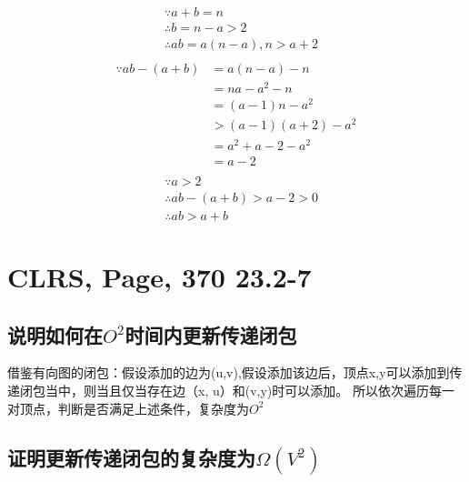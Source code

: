 \documentclass[UTF8]{ctexart}
\begin{document}
\begin{displaymath}
    \begin{aligned}
    &\because a+b=n\\
    &\therefore b=n-a>2\\
    &\therefore ab=a(n-a), n>a+2 \\
\end{aligned}
\end{displaymath}
\begin{displaymath}
    \begin{aligned}
    \because ab-(a+b)&=a(n-a)-n \\
    &=na-a^2-n \\
    &=(a-1)n-a^2 \\
    &>(a-1)(a+2)-a^2 \\
    &=a^2+a-2-a^2 \\
    &=a-2 \\
\end{aligned}
\end{displaymath}
\begin{displaymath}
    \begin{aligned}
    &\because a>2 \\
    &\therefore ab-(a+b)>a-2>0 \\
    &\therefore ab>a+b
    \end{aligned}
\end{displaymath}


\section{CLRS, Page, 370 23.2-7}

\subsection{说明如何在${O^2}$时间内更新传递闭包}

借鉴有向图的闭包：假设添加的边为(u,v),假设添加该边后，顶点x,y可以添加到传递闭包当中，则当且仅当存在边（x, u）和(v,y)时可以添加。
所以依次遍历每一对顶点，判断是否满足上述条件，复杂度为${O^2}$


 \subsection{证明更新传递闭包的复杂度为$\Omega(V^2)$}
\end{document}
